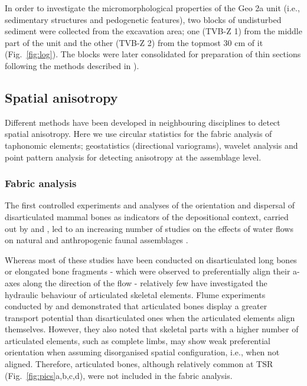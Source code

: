 \documentclass[5p,times,authoryear]{elsarticle}
\begin{document}
In order to investigate the micromorphological properties of the Geo 2a unit (i.e., sedimentary structures and pedogenetic features), two blocks of undisturbed sediment were collected from the excavation area; one (TVB-Z 1) from the middle part of the unit and the other (TVB-Z 2) from the topmost 30 cm of it (Fig.~\ref{fig:log}). The blocks were later consolidated for preparation of thin sections following the methods described in \citet{Murphy1986}).

\subsection{Spatial anisotropy}

Different methods have been developed in neighbouring disciplines to detect spatial anisotropy. Here we use circular statistics for the fabric analysis of taphonomic elements; geostatistics (directional variograms), wavelet analysis and point pattern analysis for detecting anisotropy at the assemblage level.

\subsubsection{Fabric analysis}

The first controlled experiments and analyses of the orientation and dispersal of disarticulated  mammal bones as indicators of the depositional context, carried out by \cite{Toots1965} and \cite{Voorhies1969}, led to an increasing number of studies on the effects of water flows on natural and anthropogenic faunal assemblages \citep[][among others]{Nash1987,Schick1987a,Petraglia1987,Petraglia1994,Fiorillo1991,Benito-Calvo2011,Torre2013a,Dominguez-Rodrigo2012,Dominguez-Rodrigo2014,Dominguez-Rodrigo2014c,Cobo-Sanchez2014,Aramendi2017,Organista2017}.

Whereas most of these studies have been conducted on disarticulated long bones or elongated bone fragments - which were observed to preferentially align their a-axes along the direction of the flow - relatively few have investigated the hydraulic behaviour of articulated skeletal elements. Flume experiments conducted by \cite{Coard1995} and \cite{Coard1999} demonstrated that articulated bones display a greater transport potential than disarticulated ones when the articulated elements align themselves. However, they also noted that skeletal parts with a higher number of articulated elements, such as complete limbs, may show weak preferential orientation when assuming disorganised spatial configuration, i.e., when not aligned. Therefore, articulated bones, although relatively common at TSR (Fig.~\ref{fig:pics}a,b,c,d), were not included in the fabric analysis.
\end{document}

